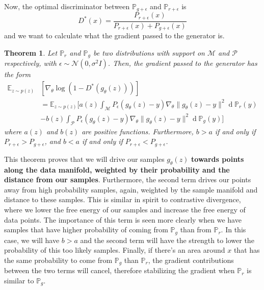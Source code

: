 \documentclass{article} %
\newcommand\EE{\mathbb{E}}
\newcommand\manP{\mathcal{P}}
\newcommand\manM{\mathcal{M}}
\newcommand\PP{\mathbb{P}}
\renewcommand{\d}[1]{\ensuremath{\operatorname{d}\!{#1}}}
\newtheorem{theo}{Theorem}[section]
\theoremstyle{definition}
\begin{document}
Now, the optimal discriminator between $\PP_{g+\epsilon}$ and $\PP_{r + \epsilon}$ is
$$ D^*(x) = \frac{P_{r+\epsilon}(x)}{P_{r+\epsilon}(x) + P_{g+ \epsilon}(x)}$$
and we want to calculate what the gradient passed to the generator is.
\begin{theo} \label{theo::gradnoise}
Let $\PP_r$ and $\PP_g$ be two distributions with support on $\manM$ and $\manP$
respectively, with $\epsilon \sim \mathcal{N}(0, \sigma^2I)$. Then, the gradient passed to the
generator has the form
\begin{align}
\EE_{z \sim p(z)} &\left[ \nabla_\theta \log(1 - D^*(g_\theta(z))) \right] \label{eq::update1}\\
&= \EE_{z \sim p(z)}\bigg[a(z) \int_\manM P_\epsilon(g_\theta(z)-y) \nabla_\theta 
\|g_\theta(z)-y\|^2 \d \PP_r(y) \nonumber
\\&- b(z) \int_\manP P_\epsilon(g_\theta(z)-y) \nabla_\theta 
\|g_\theta(z) - y\|^2 \d \PP_g(y) \bigg] \nonumber
\end{align}
where $a(z)$ and $b(z)$ are positive functions. Furthermore, $b > a$ if and only if
$P_{r + \epsilon} > P_{g + \epsilon}$, and $b < a$ if and only if $P_{r + \epsilon} < P_{g
+\epsilon}$.
\end{theo}
This theorem proves that we will drive our samples $g_\theta(z)$ \textbf{towards points along
the data manifold, weighted by their probability and the distance from our samples}. Furthermore,
the second term drives our points away from high probability samples, again, weighted by the
sample manifold and distance to these samples. This is similar in spirit 
to contrastive divergence, where
we lower the free energy of our samples and increase the free energy of data points. The importance
of this term is seen more clearly when we have samples that have higher probability of coming
from $\PP_g$ than from $\PP_r$. In this case, we will have $b > a$ and the second term will
have the strength to lower the probability of this too likely samples. Finally, if
there's an area around $x$ that has the same probability to come from $\PP_g$ than $\PP_r$, 
the gradient contributions between the two terms will cancel, therefore stabilizing the gradient
when $\PP_r$ is similar to $\PP_g$.
\end{document}
